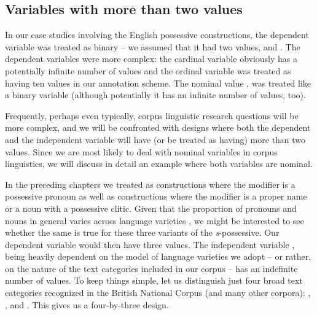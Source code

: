 \subsection{Variables with more than two values}
\label{sec:morethantwovalues}

In our case studies involving the English possessive constructions, the dependent variable  was treated as binary -- we assumed that it had two values,  and .  The dependent variables were more complex: the cardinal  variable   obviously has a potentially infinite number of values and the ordinal  variable   was treated as having ten values in our annotation  scheme. The nominal  value , was treated like a binary variable (although potentially it has an infinite number of values, too).

Frequently, perhaps even typically, corpus linguistic research questions will be more complex, and we will be confronted with designs  where both the dependent and the independent variable will have (or be treated as having) more than two values. Since we are most likely to deal with nominal  variables in corpus linguistics, we will discuss in detail an example where both variables are nominal.

In the preceding chapters we treated as   constructions where the modifier is a possessive pronoun as well as constructions where the modifier is a proper name or a noun  with a possessive clitic.  Given that the proportion of pronouns  and nouns in general varies across language varieties  \citep{biber_longman_1999}, we might be interested to see whether the same is true for these three variants of the \textit{s}-possessive. Our dependent variable   would then have three values. The independent variable ,  being heavily dependent on the model of language varieties  we adopt -- or rather, on the nature of the text categories included in our corpus -- has an indefinite number of values. To keep things simple, let us distinguish just four broad text categories recognized in the British National Corpus (and many other corpora): ,  ,    and . This gives us a four\hyp{}by\hyp{}three  design.

